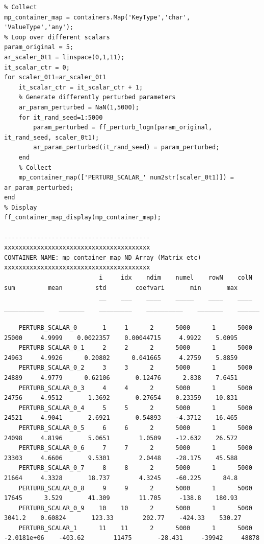 \documentclass[
]{book}
\begin{document}
\begin{verbatim}
% Collect
mp_container_map = containers.Map('KeyType','char', 'ValueType','any');
% Loop over different scalars
param_original = 5;
ar_scaler_0t1 = linspace(0,1,11);
it_scalar_ctr = 0;
for scaler_0t1=ar_scaler_0t1
    it_scalar_ctr = it_scalar_ctr + 1;
    % Generate differently perturbed parameters
    ar_param_perturbed = NaN(1,5000);
    for it_rand_seed=1:5000
        param_perturbed = ff_perturb_logn(param_original, it_rand_seed, scaler_0t1);
        ar_param_perturbed(it_rand_seed) = param_perturbed;
    end
    % Collect
    mp_container_map(['PERTURB_SCALAR_' num2str(scaler_0t1)]) = ar_param_perturbed;
end
% Display
ff_container_map_display(mp_container_map);

----------------------------------------
xxxxxxxxxxxxxxxxxxxxxxxxxxxxxxxxxxxxxxxx
CONTAINER NAME: mp_container_map ND Array (Matrix etc)
xxxxxxxxxxxxxxxxxxxxxxxxxxxxxxxxxxxxxxxx
                          i     idx    ndim    numel    rowN    colN        sum         mean         std        coefvari       min       max  
                          __    ___    ____    _____    ____    ____    ___________    _______    _________    __________    _______    ______

    PERTURB_SCALAR_0       1     1      2      5000      1      5000          25000     4.9999    0.0022357    0.00044715     4.9922    5.0095
    PERTURB_SCALAR_0_1     2     2      2      5000      1      5000          24963     4.9926      0.20802      0.041665     4.2759    5.8859
    PERTURB_SCALAR_0_2     3     3      2      5000      1      5000          24889     4.9779      0.62106       0.12476      2.838    7.6451
    PERTURB_SCALAR_0_3     4     4      2      5000      1      5000          24756     4.9512       1.3692       0.27654    0.23359    10.831
    PERTURB_SCALAR_0_4     5     5      2      5000      1      5000          24521     4.9041       2.6921       0.54893    -4.3712    16.465
    PERTURB_SCALAR_0_5     6     6      2      5000      1      5000          24098     4.8196       5.0651        1.0509    -12.632    26.572
    PERTURB_SCALAR_0_6     7     7      2      5000      1      5000          23303     4.6606       9.5301        2.0448    -28.175    45.588
    PERTURB_SCALAR_0_7     8     8      2      5000      1      5000          21664     4.3328       18.737        4.3245    -60.225      84.8
    PERTURB_SCALAR_0_8     9     9      2      5000      1      5000          17645      3.529       41.309        11.705     -138.8    180.93
    PERTURB_SCALAR_0_9    10    10      2      5000      1      5000         3041.2    0.60824       123.33        202.77    -424.33    530.27
    PERTURB_SCALAR_1      11    11      2      5000      1      5000    -2.0181e+06    -403.62        11475       -28.431     -39942     48878
\end{verbatim}
\end{document}
